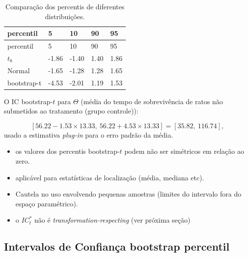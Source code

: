 \documentclass[
  letterpaper,
  DIV=11,
  numbers=noendperiod]{scrreprt}
\begin{document}
\begin{longtable}[]{@{}lllll@{}}
\caption{Comparação dos percentis de diferentes
distribuições.}\tabularnewline
\toprule\noalign{}
percentil & 5 & 10 & 90 & 95 \\
\midrule\noalign{}
\endfirsthead
\toprule\noalign{}
percentil & 5 & 10 & 90 & 95 \\
\midrule\noalign{}
\endhead
\bottomrule\noalign{}
\endlastfoot
\(t_8\) & -1.86 & -1.40 & 1.40 & 1.86 \\
Normal & -1.65 & -1.28 & 1.28 & 1.65 \\
bootstrap-t & -4.53 & -2.01 & 1.19 & 1.53 \\
\end{longtable}

O IC bootstrap-\(t\) para \(\Theta\) (média do tempo de sobrevivência de
ratos não submetidos ao tratamento (grupo controle)):

\[\left[ 56.22-1.53 \times 13.33, \ 56.22+4.53  \times 13.33\right]=\left[35.82, \ 116.74\right],\]
usado a estimativa \textit{plug-in} para o erro padrão da média.

\begin{tcolorbox}[enhanced jigsaw, left=2mm, toprule=.15mm, opacityback=0, title=\textcolor{quarto-callout-tip-color}{\faLightbulb}\hspace{0.5em}{Considerações Finais}, leftrule=.75mm, breakable, colbacktitle=quarto-callout-tip-color!10!white, coltitle=black, rightrule=.15mm, bottomtitle=1mm, toptitle=1mm, colframe=quarto-callout-tip-color-frame, colback=white, opacitybacktitle=0.6, bottomrule=.15mm, arc=.35mm, titlerule=0mm]

\begin{itemize}
\item
  os valores dos percentis bootstrap-\(t\) podem não ser simétricos em
  relação ao zero.
\item
  aplicável para estatísticas de localização (média, mediana etc).
\item
  Cautela no uso envolvendo pequenas amostras (limites do intervalo fora
  do espaço paramétrico).
\item
  o \(IC^*_t\) não é \emph{transformation-respecting} (ver próxima
  seção)
\end{itemize}

\end{tcolorbox}

\subsection{Intervalos de Confiança bootstrap
percentil}\label{intervalos-de-confianuxe7a-bootstrap-percentil}
\end{document}
